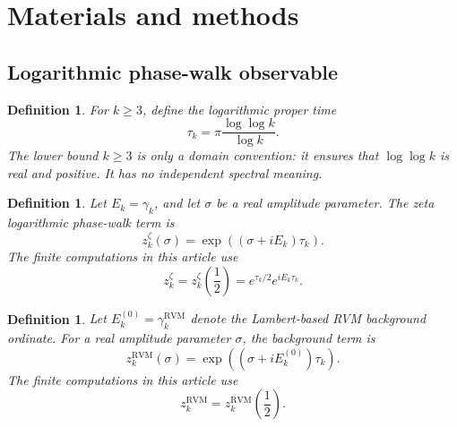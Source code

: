 \documentclass[12pt]{article}
\numberwithin{equation}{section}
\newtheorem{definition}[theorem]{Definition}
\newcommand{\RVM}{\mathrm{RVM}}
\begin{document}
\section{Materials and methods}
\label{sec:materials_methods}

\subsection{Logarithmic phase-walk observable}
\label{sec:logarithmic_proper_time_transform}

\begin{definition}
\label{def:logarithmic_proper_time}
For \(k\geq 3\), define the logarithmic proper time
\begin{equation}
\tau_k
=
\pi\frac{\log\log k}{\log k}.
\label{eq:def_logarithmic_proper_time}
\end{equation}
The lower bound \(k\geq 3\) is only a domain convention: it ensures that \(\log\log k\) is real and positive. It has no independent spectral meaning.
\end{definition}

\begin{definition}
\label{def:zeta_transform}
Let \(E_k=\gamma_k\), and let \(\sigma\) be a real amplitude parameter.  The zeta logarithmic phase-walk term is
\begin{equation}
z_k^\zeta(\sigma)
=
\exp\left(
\left(\sigma+iE_k\right)\tau_k
\right).
\label{eq:def_zeta_transform_sigma}
\end{equation}
The finite computations in this article use
\begin{equation}
z_k^\zeta
=
z_k^\zeta\left(\frac{1}{2}\right)
=
e^{\tau_k/2}e^{iE_k\tau_k}.
\label{eq:def_zeta_transform}
\end{equation}
\end{definition}

\begin{definition}
\label{def:rvm_transform}
Let \(E_k^{(0)}=\gamma_k^{\RVM}\) denote the Lambert-based RVM background ordinate.  For a real amplitude parameter \(\sigma\), the background term is
\begin{equation}
z_k^{\RVM}(\sigma)
=
\exp\left(
\left(\sigma+iE_k^{(0)}\right)\tau_k
\right).
\label{eq:def_rvm_transform_sigma}
\end{equation}
The finite computations in this article use
\begin{equation}
z_k^{\RVM}
=
z_k^{\RVM}\left(\frac{1}{2}\right).
\label{eq:def_rvm_transform}
\end{equation}
\end{definition}
\end{document}
